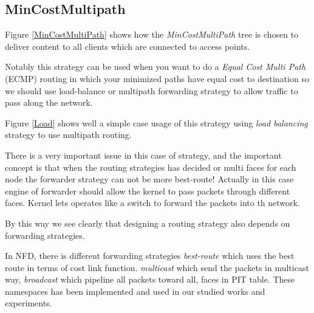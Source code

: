 \subsection{MinCostMultipath}
Figure \ref{MinCostMultiPath} shows how the \textit{MinCostMultiPath} tree is chosen to deliver content to all clients which are connected to access points.
 
Notably this strategy can be used when you want to do a \textit{Equal Cost Multi Path} (ECMP) routing in which your minimized paths have equal cost to destination so we should use load-balance or multipath forwarding strategy to allow traffic to pass along the network. 

Figure \ref{Load} shows well a simple case usage of this strategy using \textit{load balancing} strategy to use multipath routing.

There is a very important issue in this case of strategy, and the important concept is that when the routing strategies has decided or multi faces for each node the forwarder strategy can not be more best-route! Actually in this case engine of forwarder should allow the kernel to pass packets through different faces. Kernel lets operates like a switch to forward the packets into th network.

By this way we see clearly that designing a routing strategy also depends on forwarding strategies. 

In NFD, there is different forwarding strategies \textit{best-route} which uses the best route in terms of cost link function. \textit{multicast} which send the packets in multicast way, \textit{broadcast} which pipeline all packets toward all, faces in PIT table. These namespaces has been implemented and used in our studied works and experiments.

